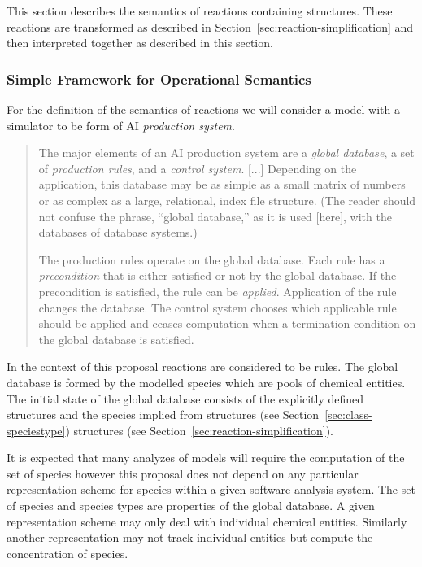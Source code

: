 \documentclass{cekarticle}
\begin{document}
This section describes the semantics of reactions containing
 structures.  These reactions are transformed
as described in Section~\ref{sec:reaction-simplification} and then
interpreted together as described in this section.

\subsubsection{Simple Framework for Operational Semantics}

For the definition of the semantics of reactions we will consider a model with a simulator to be form of
AI \emph{production system}.

\begin{quote}
The major elements of an AI production system are a \emph{global database}, a set of
\emph{production rules}, and a \emph{control system}.
[...]
Depending on the application, this database may be as simple as a small matrix of numbers or as
complex as a large, relational, index file structure.  (The reader should not confuse the phrase,
``global database,'' as it is used [here], with the databases of database systems.)

The production rules operate on the global database.  Each rule has a \emph{precondition} that is either
satisfied or not by the global database.  If the precondition is satisfied, the rule can be
\emph{applied}.  Application of the rule changes the database.  The control system chooses which
applicable rule should be applied and ceases computation when a termination condition on the global
database is satisfied.~\citep{Nilsson:1982}
\end{quote}

In the context of this proposal reactions are considered to be
rules. The global database is formed by the modelled species which
are pools of chemical entities.  The initial state of the global
database consists of the explicitly defined 
structures and the species implied from 
structures (see Section~\ref{sec:class-speciestype})
 structures (see
Section~\ref{sec:reaction-simplification}).

It is expected that many analyzes of models will require the
computation of the set of species however this proposal does not
depend on any particular representation scheme for species within
a given software analysis system.  The set of species and species
types are properties of the global database. A given
representation scheme may only deal with individual chemical
entities. Similarly another representation may not track
individual entities but compute the concentration of species.
\end{document}
